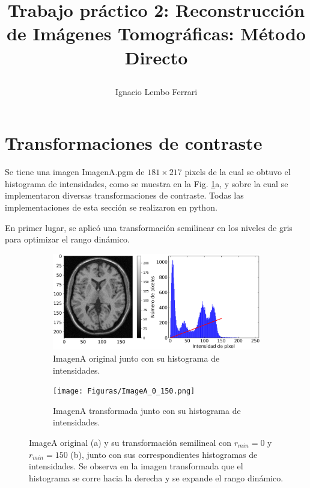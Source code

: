 \documentclass[11pt,twocolumn,twoside]{opticajnl}
\title{
\vspace{0.1cm} 

Trabajo práctico 2: Reconstrucción de Imágenes Tomográficas: Método Directo}
\author[1]{\huge{Ignacio Lembo Ferrari}}
\affil[1]{\large{ignaciolembo@ib.edu.ar} 

\vspace{0.1cm}

{\datesfont 16 de marzo del 2024.}

\vspace{0.1cm}
}
\begin{document}
\maketitle

\section{Transformaciones de contraste\label{sec:ej1ej2}}

\vspace{0.3cm}

Se tiene una imagen ImagenA.pgm de $181\times217$ pixels de la cual se obtuvo el histograma de intensidades, como se muestra en la Fig. \ref{fig:Semilineartrans}a, y sobre la cual se implementaron diversas transformaciones de contraste. Todas las implementaciones de esta sección se realizaron en python.

En primer lugar, se aplicó una transformación semilinear en los niveles de gris para optimizar el rango dinámico. 

\begin{figure}[h]
    \centering
         \begin{subfigure}[h]{\linewidth}
            \centering
            \includegraphics[width=\textwidth]{Figuras/ImageA_brute.png}
            \caption{ImagenA original junto con su histograma de intensidades.} 
         \end{subfigure}
         \begin{subfigure}[h]{\linewidth}
            \centering
            \texttt{[image: Figuras/ImageA\_0\_150.png]}
            \caption{ImagenA transformada junto con su histograma de intensidades.}
         \end{subfigure}
    \caption{ImageA original (a) y su transformación semilineal con $r_{min} = 0$ y $r_{min} = 150$ (b), junto con sus correspondientes histogramas de intensidades. Se observa en la imagen transformada que el histograma se corre hacia la derecha y se expande el rango dinámico.}
    \label{fig:Semilineartrans}
\end{figure}
\end{document}
